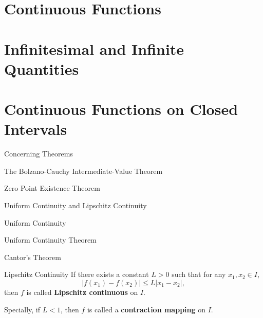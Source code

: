 \documentclass[11pt]{../../TexTemplate/elegantbook}
\begin{document}
\section{Continuous Functions}

\section{Infinitesimal and Infinite Quantities}

\section{Continuous Functions on Closed Intervals}
\begin{leftbarTitle}{Concerning Theorems}\end{leftbarTitle}


\begin{theorem}{The Bolzano-Cauchy Intermediate-Value Theorem}\label{thm:Indeterminate Value Theorem}

\end{theorem}

\begin{theorem}{Zero Point Existence Theorem}\label{thm:Zero Point Existence Theorem}

\end{theorem}

\begin{leftbarTitle}{Uniform Continuity and Lipschitz Continuity}\end{leftbarTitle}

\begin{definition}{Uniform Continuity}
    
\end{definition}

\begin{theorem}{Uniform Continuity Theorem}
    
\end{theorem}


\begin{theorem}{Cantor's Theorem}
    
\end{theorem}


\begin{definition}{Lipschitz Continuity}\label{def:Lipschitz Continuity}
    If there exists a constant \(L > 0\) such that for any \(x_1, x_2 \in I\), 
    \[
        \left| f(x_{1}) - f(x_{2}) \right| \leqslant L \left| x_{1} - x_{2} \right|,
    \]
    then \(f\) is called \textbf{Lipschitz continuous} on \(I\).

    Specially, if \(L < 1\), then \(f\) is called a \textbf{contraction mapping} on \(I\).
\end{definition}
\end{document}
